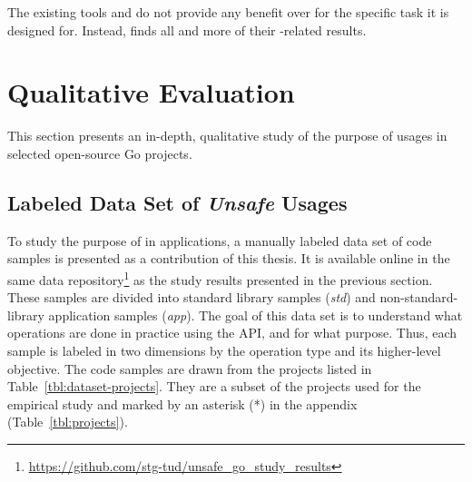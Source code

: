 \begin{answerToRQ}[\ref{rq:linterComparison}]
    The existing tools \toolVet{} and \toolGosec{} do not provide any benefit over \toolGeiger{} for the specific task
    it is designed for.
    Instead, \toolGeiger{} finds all and more of their \unsafe{}-related results.
\end{answerToRQ}



\section{Qualitative Evaluation}\label{sec:go-geiger:qualitative-evaluation}

This section presents an in-depth, qualitative study of the purpose of \unsafe{} usages in
\projsForLabeledCodeSnippets{} selected open-source Go projects.



\subsection{Labeled Data Set of \textit{Unsafe} Usages}\label{subsec:go-geiger:qualitative-evaluation:labeled-dataset}

To study the purpose of \unsafe{} in applications, a manually labeled data set of \numberLabeledCodeSnippets{} code
samples is presented as a contribution of this thesis.
It is available online in the same data repository\footnote{\url{https://github.com/stg-tud/unsafe_go_study_results}} as
the study results presented in the previous section.
These samples are divided into \numberLabeledCodeSnippetsStd{} standard library samples (\textit{std}) and
\numberLabeledCodeSnippetsApp{} non-standard-library application samples (\textit{app}).
The goal of this data set is to understand what operations are done in practice using the \unsafe{} \acrshort{API},
and for what purpose.
Thus, each sample is labeled in two dimensions by the operation type and its higher-level objective.
The \numberLabeledCodeSnippets{} code samples are drawn from the projects listed in Table~\ref{tbl:dataset-projects}.
They are a subset of the projects used for the empirical study and marked by an asterisk (*) in the appendix
(Table~\ref{tbl:projects}).

